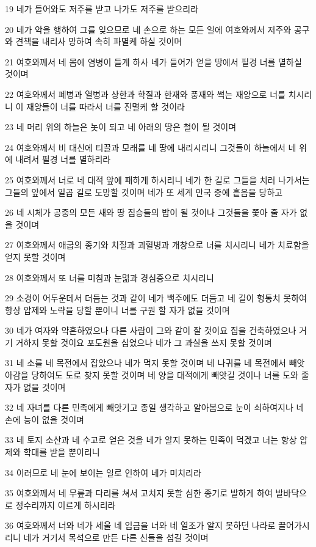\par 19 네가 들어와도 저주를 받고 나가도 저주를 받으리라
\par 20 네가 악을 행하여 그를 잊으므로 네 손으로 하는 모든 일에 여호와께서 저주와 공구와 견책을 내리사 망하여 속히 파멸케 하실 것이며
\par 21 여호와께서 네 몸에 염병이 들게 하사 네가 들어가 얻을 땅에서 필경 너를 멸하실 것이며
\par 22 여호와께서 폐병과 열병과 상한과 학질과 한재와 풍재와 썩는 재앙으로 너를 치시리니 이 재앙들이 너를 따라서 너를 진멸케 할 것이라
\par 23 네 머리 위의 하늘은 놋이 되고 네 아래의 땅은 철이 될 것이며
\par 24 여호와께서 비 대신에 티끌과 모래를 네 땅에 내리시리니 그것들이 하늘에서 네 위에 내려서 필경 너를 멸하리라
\par 25 여호와께서 너로 네 대적 앞에 패하게 하시리니 네가 한 길로 그들을 치러 나가서는 그들의 앞에서 일곱 길로 도망할 것이며 네가 또 세계 만국 중에 흩음을 당하고
\par 26 네 시체가 공중의 모든 새와 땅 짐승들의 밥이 될 것이나 그것들을 쫓아 줄 자가 없을 것이며
\par 27 여호와께서 애굽의 종기와 치질과 괴혈병과 개창으로 너를 치시리니 네가 치료함을 얻지 못할 것이며
\par 28 여호와께서 또 너를 미침과 눈멂과 경심증으로 치시리니
\par 29 소경이 어두운데서 더듬는 것과 같이 네가 백주에도 더듬고 네 길이 형통치 못하여 항상 압제와 노략을 당할 뿐이니 너를 구원 할 자가 없을 것이며
\par 30 네가 여자와 약혼하였으나 다른 사람이 그와 같이 잘 것이요 집을 건축하였으나 거기 거하지 못할 것이요 포도원을 심었으나 네가 그 과실을 쓰지 못할 것이며
\par 31 네 소를 네 목전에서 잡았으나 네가 먹지 못할 것이며 네 나귀를 네 목전에서 빼앗아감을 당하여도 도로 찾지 못할 것이며 네 양을 대적에게 빼앗길 것이나 너를 도와 줄 자가 없을 것이며
\par 32 네 자녀를 다른 민족에게 빼앗기고 종일 생각하고 알아봄으로 눈이 쇠하여지나 네 손에 능이 없을 것이며
\par 33 네 토지 소산과 네 수고로 얻은 것을 네가 알지 못하는 민족이 먹겠고 너는 항상 압제와 학대를 받을 뿐이리니
\par 34 이러므로 네 눈에 보이는 일로 인하여 네가 미치리라
\par 35 여호와께서 네 무릎과 다리를 쳐서 고치지 못할 심한 종기로 발하게 하여 발바닥으로 정수리까지 이르게 하시리라
\par 36 여호와께서 너와 네가 세울 네 임금을 너와 네 열조가 알지 못하던 나라로 끌어가시리니 네가 거기서 목석으로 만든 다른 신들을 섬길 것이며
